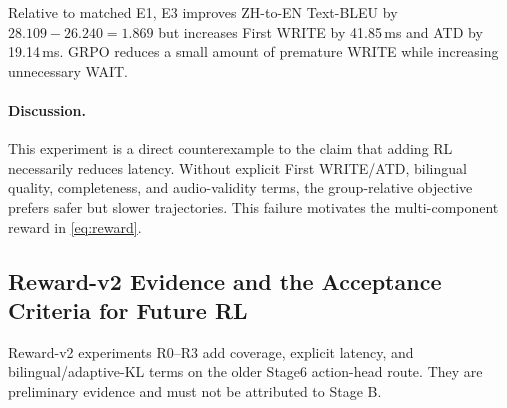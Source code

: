 \documentclass[11pt,a4paper]{article}
\begin{document}
\begin{table}[H]
\centering
\caption{Main quality and latency results of the earlier action-only GRPO experiment. This is not RL on the current Stage B model.}
\label{tab:old_grpo}
\end{table}

Relative to matched E1, E3 improves ZH-to-EN Text-BLEU by $28.109-26.240=1.869$ but increases First WRITE by 41.85\,ms and ATD by 19.14\,ms. GRPO reduces a small amount of premature WRITE while increasing unnecessary WAIT.

\paragraph{Discussion.}
This experiment is a direct counterexample to the claim that adding RL necessarily reduces latency. Without explicit First WRITE/ATD, bilingual quality, completeness, and audio-validity terms, the group-relative objective prefers safer but slower trajectories. This failure motivates the multi-component reward in \cref{eq:reward}.

\subsection{Reward-v2 Evidence and the Acceptance Criteria for Future RL}

Reward-v2 experiments R0--R3 add coverage, explicit latency, and bilingual/adaptive-KL terms on the older Stage6 action-head route. They are preliminary evidence and must not be attributed to Stage B.
\end{document}
